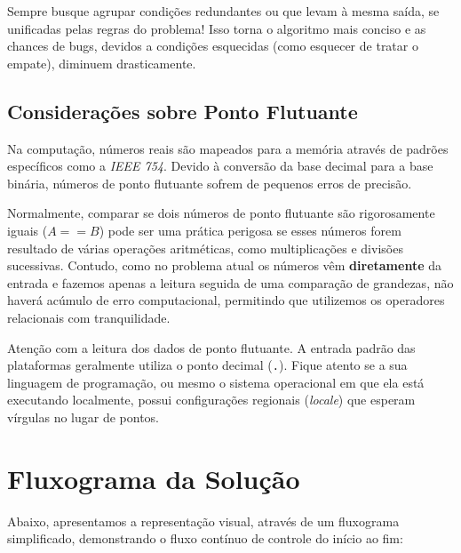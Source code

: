 \documentclass[12pt]{article}
\begin{document}
\begin{successbox}
Sempre busque agrupar condições redundantes ou que levam à mesma saída, se unificadas pelas regras do problema! Isso torna o algoritmo mais conciso e as chances de bugs, devidos a condições esquecidas (como esquecer de tratar o empate), diminuem drasticamente.
\end{successbox}

\newpage
\subsection*{Considerações sobre Ponto Flutuante}

Na computação, números reais são mapeados para a memória através de padrões específicos como a \textit{IEEE 754}. Devido à conversão da base decimal para a base binária, números de ponto flutuante sofrem de pequenos erros de precisão.

Normalmente, comparar se dois números de ponto flutuante são rigorosamente iguais ($A == B$) pode ser uma prática perigosa se esses números forem resultado de várias operações aritméticas, como multiplicações e divisões sucessivas. Contudo, como no problema atual os números vêm \textbf{diretamente} da entrada e fazemos apenas a leitura seguida de uma comparação de grandezas, não haverá acúmulo de erro computacional, permitindo que utilizemos os operadores relacionais com tranquilidade.

\begin{warnbox}
Atenção com a leitura dos dados de ponto flutuante. A entrada padrão das plataformas geralmente utiliza o ponto decimal (\texttt{.}). Fique atento se a sua linguagem de programação, ou mesmo o sistema operacional em que ela está executando localmente, possui configurações regionais (\textit{locale}) que esperam vírgulas no lugar de pontos.
\end{warnbox}

\vspace{1cm}

\section*{Fluxograma da Solução}
Abaixo, apresentamos a representação visual, através de um fluxograma simplificado, demonstrando o fluxo contínuo de controle do início ao fim:
\end{document}
